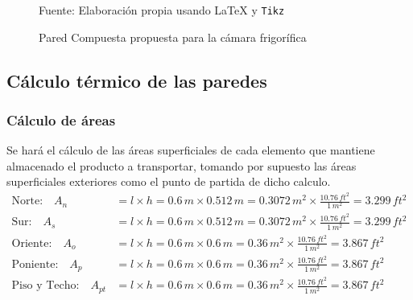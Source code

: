 \begin{figure}[H]
	\centering
	\caption{Pared Compuesta propuesta para la cámara frigorífica} Fuente: Elaboración propia usando \LaTeX \; y \texttt{Tikz}
	\label{fig:paredes-peliculas}
\end{figure}
 
\subsection{Cálculo térmico de las paredes}
\subsubsection{Cálculo de áreas}
Se hará el cálculo de las áreas superficiales de cada elemento que mantiene almacenado
el producto a transportar, tomando por supuesto las áreas superficiales exteriores como
el punto de partida de dicho calculo.
\begin{equation}
	\begin{aligned}
		\text{Norte:}\quad A_n &=l\times  h=  0.6\, m \times 0.512\, m = 0.3072\, m^2 \times \frac{10.76\, ft^2}{1\, m^2} = 3.299\, ft^2 \\ 
		\text{Sur:}\quad A_s &=l\times h=  0.6\, m \times 0.512\, m = 0.3072\, m^2 \times \frac{10.76\, ft^2}{1\, m^2} = 3.299\, ft^2 \\ 
		\text{Oriente:} \quad A_o &=l\times h= 0.6\, m \times 0.6\, m = 0.36\, m^2 \times \frac{10.76\, ft^2}{1\, m^2} = 3.867\, ft^2 \\ 
		\text{Poniente:}\quad A_p &=l\times h= 0.6\, m \times 0.6\, m = 0.36\, m^2 \times \frac{10.76\, ft^2}{1\, m^2} = 3.867\, ft^2 \\ 
		\text{Piso y Techo:}\quad A_{pt} &=l\times h=  0.6\, m \times 0.6\, m = 0.36\, m^2 \times \frac{10.76\, ft^2}{1\, m^2} = 3.867\, ft^2
	\end{aligned}
	\label{eq:area-paredes}
\end{equation}


